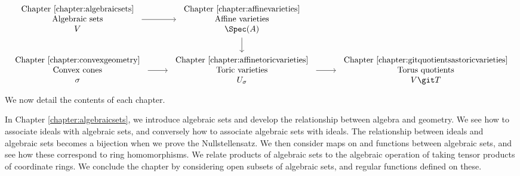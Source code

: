 \documentclass[12pt]{amsart}
\theoremstyle{plain}
\begin{document}
\[\begin{tikzcd}
	\begin{array}{c} \text{Chapter \ref{chapter:algebraicsets}} \\ \text{Algebraic sets} \\ V \end{array} & \begin{array}{c} \text{Chapter \ref{chapter:affinevarieties}} \\ \text{Affine varieties} \\ \Spec(A) \end{array} \\
	\begin{array}{c} \text{Chapter \ref{chapter:convexgeometry}} \\ \text{Convex cones} \\ \sigma \end{array} & \begin{array}{c} \text{Chapter \ref{chapter:affinetoricvarieties}} \\ \text{Toric varieties} \\ U_\sigma \end{array} & \begin{array}{c} \text{Chapter \ref{chapter:gitquotientsastoricvarieties}} \\ \text{Torus quotients} \\ V \git T \end{array}
	\arrow[from=1-1, to=1-2]
	\arrow[from=1-2, to=2-2]
	\arrow[from=2-1, to=2-2]
	\arrow[from=2-2, to=2-3]
\end{tikzcd}\]
\noindent
We now detail the contents of each chapter.

In Chapter \ref{chapter:algebraicsets}, we introduce algebraic sets and develop the relationship between algebra and geometry.
We see how to associate ideals with algebraic sets, and conversely how to associate algebraic sets with ideals.
The relationship between ideals and algebraic sets becomes a bijection when we prove the Nullstellensatz.
We then consider maps on and functions between algebraic sets, and see how these correspond to ring homomorphisms.
We relate products of algebraic sets to the algebraic operation of taking tensor products of coordinate rings.
We conclude the chapter by considering open subsets of algebraic sets, and regular functions defined on these.
\end{document}
